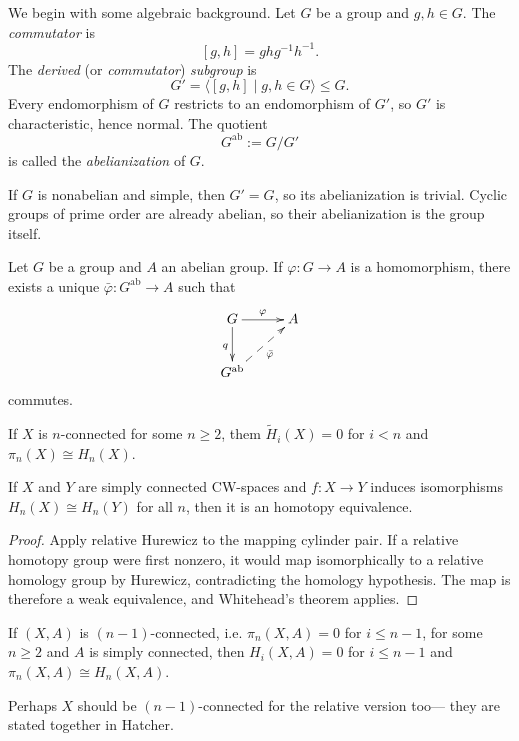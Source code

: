We begin with some algebraic background.
Let $G$ be a group and $g,h\in G$.  The
\emph{commutator} is
$$
[g,h]=ghg^{-1}h^{-1}.
$$
The \emph{derived} (or \emph{commutator})
\emph{subgroup} is
$$
G'=\langle[g,h]\mid g,h\in G\rangle
\leq G.
$$
Every endomorphism of $G$ restricts to an
endomorphism of $G'$, so $G'$ is
characteristic, hence normal.  The quotient
$$
G^{\mathrm{ab}}:=G/G'
$$
is called the \emph{abelianization} of $G$.

\begin{remark}
If $G$ is nonabelian and simple, then
$G'=G$, so its abelianization is trivial.
Cyclic groups of prime order are already
abelian, so their abelianization is the
group itself.
\end{remark}

\begin{proposition}
Let $G$ be a group and $A$ an abelian group.
If $\varphi:G\to A$ is a homomorphism,
there exists a unique
$\bar\varphi:G^{\mathrm{ab}}\to A$
such that
$$
\xymatrix@C=2.5em@R=2.5em{
G \ar[r]^{\varphi}
  \ar[d]_{q}
 & A \\
G^{\mathrm{ab}}
  \ar@{-->}[ur]_{\bar\varphi}
 &
}
$$
commutes.
\end{proposition}

\begin{theorem}[Hurewicz]
\label{theorem-hurewicz-absolute}
If $X$ is $n$-connected for some $n \geq 2$,
them $\tilde{H}_i(X)=0$ for $i<n$
and $\pi_{n}(X)\cong H_n(X)$.
\end{theorem}

\begin{lemma}
\label{lemma-hurew-homom-gives-homot-equiv}
If $X$ and $Y$ are simply connected CW-spaces
and  $f:X \to Y$ induces
isomorphisms $H_n(X) \cong H_n(Y)$ for all
$n$, then it is an homotopy
equivalence.
\end{lemma}

\begin{proof}
Apply relative Hurewicz to the mapping
cylinder pair.  If a relative homotopy group
were first nonzero, it would map
isomorphically to a relative homology group
by Hurewicz, contradicting the homology
hypothesis.  The map is therefore a weak
equivalence, and Whitehead's theorem applies.
\end{proof}

\begin{theorem}[Hurewicz]
\label{theorem-hurewicz-relative}
If $(X,A)$ is $(n-1)$-connected, i.e.
$\pi_{n}(X,A)=0$ for $i \leq n-1$, for
some $n\geq 2$ and $A$ is simply connected,
then $H_i(X,A)=0$ for $i\leq n-1$
and $\pi_{n}(X,A)\cong H_n(X,A)$.
\end{theorem}
Perhaps $X$ should be $(n-1)$-connected for
the relative version too---
they are stated together in Hatcher.

